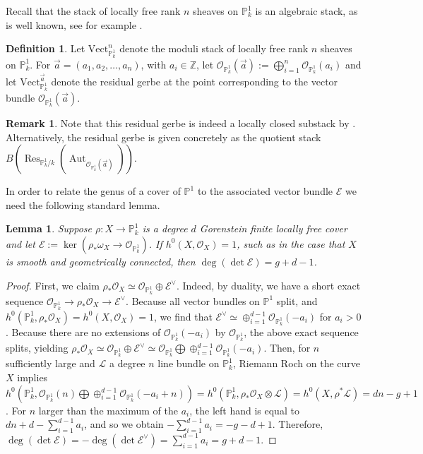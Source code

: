 \documentclass[12 pt]{amsart}
\newcommand{\rboxed}[1]{#1}
\theoremstyle{plain}
\newtheorem{lemma}[theorem]{Lemma}
\theoremstyle{definition}
\newtheorem{definition}[theorem]{Definition}
\newtheorem{remark}[theorem]{Remark}
\theoremstyle{remark}
\numberwithin{equation}{section}
\newcommand\bp{\mathbb P}
\newcommand\bz{\mathbb Z}
\newcommand\sce{\mathscr E}
\newcommand\scl{\mathscr L}
\newcommand\sco{\mathscr O}
\newcommand \ra{\rightarrow}
\newcommand\vect[2]{\mathrm{Vect}^{#1}_{#2}} %
\newcommand\vecthn[2]{\mathrm{Vect}^{#1}_{#2}} %
\DeclareMathOperator\res{Res}
\DeclareMathOperator\aut{Aut}
\begin{document}
Recall that the 
stack of locally free
rank $n$ sheaves on $\bp^1_k$
is an algebraic stack, as is well known,
see for example
\cite[Prop.\ 4.4.6]{behrend:thesis}.

\begin{definition} \label{definition:splitting-type-stratification} 
	Let $\rboxed{\vect n {\bp^1_k}}$ denote the moduli stack of locally free
	rank $n$ sheaves on $\bp^1_k$. 
	For $\vec{a} = (a_1, a_2, \ldots,
	a_n)$, with $a_i \in \bz$, let $\rboxed{\sco_{\bp^1_k}(\vec{a}) } := \bigoplus_{i=1}^n
	\sco_{\bp^1_k}(a_i)$ and let $\rboxed{\vecthn {\vec{a}} {\bp^1_k}}$
	denote the residual gerbe at the point 
	corresponding to the vector bundle $\sco_{\bp^1_k}(\vec{a})$.
 \end{definition} 
	
\begin{remark}
	\label{remark:}
	Note that this residual gerbe is indeed a locally closed substack by \cite[Thm.\ B.2]{rydh:etale-devissage}.
Alternatively, the residual gerbe is given concretely as the quotient stack
$B(\res_{\bp^1_k/k}(\aut_{\mathscr O_{\bp^1_k}(\vec{a})}))$.
\end{remark}

In order to relate the genus of a cover of $\bp^1$ to the associated vector bundle $\sce$
we need the following standard lemma.
\begin{lemma}
	\label{lemma:degree-of-e}
	Suppose $\rho: X \ra \bp^1_k$ is a degree $d$ Gorenstein finite locally free cover and let
	$\sce := \ker (\rho_* \omega_X \to \sco_{\bp^1_k})$.
If $h^0(X, \sco_X) = 1$, such as in the case that $X$ is smooth and geometrically connected,
	then $\deg(\det \sce) = g + d - 1$.
\end{lemma}
\begin{proof}
	First, we claim $\rho_* \sco_X \simeq \sco_{\bp^1_k} \oplus \sce^\vee$.
	Indeed, by duality, we have a short  exact sequence $\sco_{\bp^1_k} \ra \rho_* \sco_X \ra \sce^\vee.$
	Because all vector bundles on $\bp^1$ split, and $h^0(\bp^1_k, \rho_* \sco_X) = h^0(X, \sco_X) = 1$, we find that $\sce^\vee \simeq \oplus_{i=1}^{d-1} \sco_{\bp^1_k}(-a_i)$ for $a_i > 0$.
	Because there are no extensions of $\sco_{\bp^1_k}(-a_i)$ by $\sco_{\bp^1_k}$, the above exact sequence splits, yielding $\rho_* \sco_X \simeq \sco_{\bp^1_k} \oplus \sce^\vee \simeq \sco_{\bp^1_k} \bigoplus \oplus_{i=1}^{d-1} \sco_{\bp^1_k}(-a_i)$.
	Then, for $n$ sufficiently large and $\scl$ a degree $n$ line bundle on
	$\bp^1_k$, Riemann Roch 
on the curve $X$ implies $h^0(\bp^1_k, \sco_{\bp^1_k}(n) \bigoplus
\oplus_{i=1}^{d-1} \sco_{\bp^1_k}(-a_i + n)) = h^0(\bp^1_k, \rho_* \sco_X \otimes \scl) = h^0(X, \rho^* \scl) = dn -g + 1$.
For $n$ larger than the maximum of the $a_i$, the left hand is equal to $dn + d -\sum_{i=1}^{d-1} a_i$, and so we obtain $-\sum_{i=1}^{d-1} a_i = -g -d + 1$.
Therefore, $\deg(\det \sce) = -\deg(\det \sce^\vee) = \sum_{i=1}^{d-1}a_i = g + d - 1$.
\end{proof}
\end{document}
